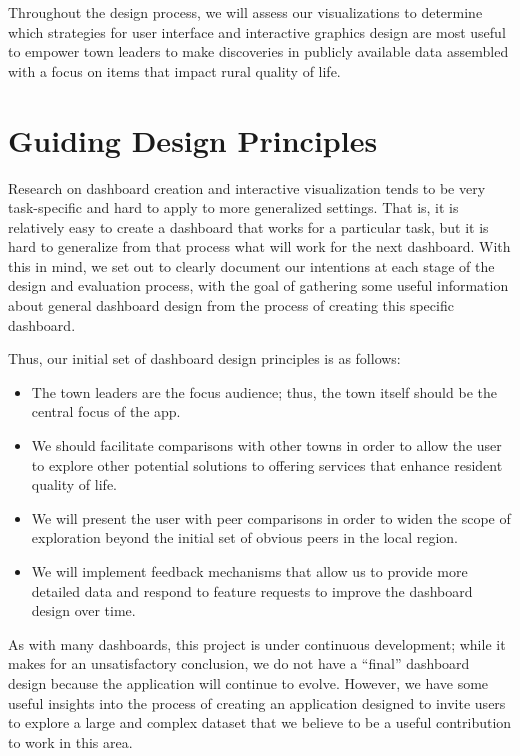 \documentclass[print]{nuthesis}
\begin{document}
Throughout the design process, we will assess our visualizations to determine which strategies for user interface and interactive graphics design are most useful to empower town leaders to make discoveries in publicly available data assembled with a focus on items that impact rural quality of life.

\hypertarget{guiding-design-principles}{%
\section{Guiding Design Principles}\label{guiding-design-principles}}

Research on dashboard creation and interactive visualization tends to be very task-specific and hard to apply to more generalized settings. That is, it is relatively easy to create a dashboard that works for a particular task, but it is hard to generalize from that process what will work for the next dashboard. With this in mind, we set out to clearly document our intentions at each stage of the design and evaluation process, with the goal of gathering some useful information about general dashboard design from the process of creating this specific dashboard.

Thus, our initial set of dashboard design principles is as follows:

\begin{itemize}
\item The town leaders are the focus audience; thus, the town itself should be the central focus of the app.
\item We should facilitate comparisons with other towns in order to allow the user to explore other potential solutions to offering services that enhance resident quality of life.
\item We will present the user with peer comparisons in order to widen the scope of exploration beyond the initial set of obvious peers in the local region.
\item We will implement feedback mechanisms that allow us to provide more detailed data and respond to feature requests to improve the dashboard design over time.
\end{itemize}

As with many dashboards, this project is under continuous development; while it makes for an unsatisfactory conclusion, we do not have a ``final'' dashboard design because the application will continue to evolve. However, we have some useful insights into the process of creating an application designed to invite users to explore a large and complex dataset that we believe to be a useful contribution to work in this area.
\end{document}
